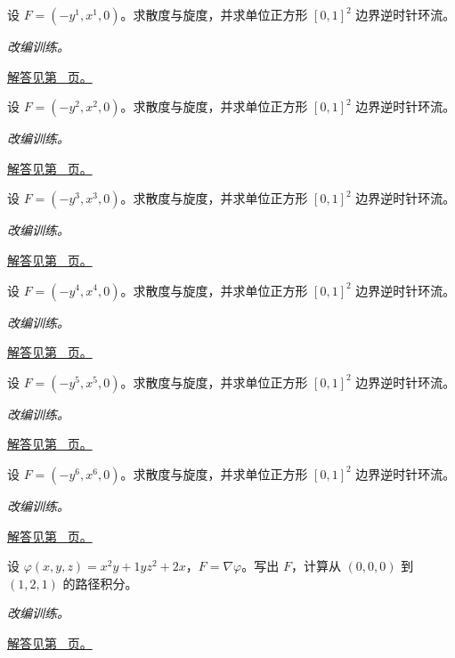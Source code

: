 \documentclass[UTF8,12pt,a4paper,fontset=fandol]{ctexart}
\begin{document}
\begin{example}[一个非零旋度的场]\label{ex:c44q7}
设 $F=(-y^{1},x^{1},0)$。求散度与旋度，并求单位正方形 $[0,1]^2$ 边界逆时针环流。
\par\textit{改编训练。}\par\hyperref[ans:c44q7]{解答见第~\pageref{ans:c44q7} 页。}
\end{example}
\begin{example}[一个非零旋度的场]\label{ex:c44q8}
设 $F=(-y^{2},x^{2},0)$。求散度与旋度，并求单位正方形 $[0,1]^2$ 边界逆时针环流。
\par\textit{改编训练。}\par\hyperref[ans:c44q8]{解答见第~\pageref{ans:c44q8} 页。}
\end{example}
\begin{example}[一个非零旋度的场]\label{ex:c44q9}
设 $F=(-y^{3},x^{3},0)$。求散度与旋度，并求单位正方形 $[0,1]^2$ 边界逆时针环流。
\par\textit{改编训练。}\par\hyperref[ans:c44q9]{解答见第~\pageref{ans:c44q9} 页。}
\end{example}
\begin{example}[一个非零旋度的场]\label{ex:c44q10}
设 $F=(-y^{4},x^{4},0)$。求散度与旋度，并求单位正方形 $[0,1]^2$ 边界逆时针环流。
\par\textit{改编训练。}\par\hyperref[ans:c44q10]{解答见第~\pageref{ans:c44q10} 页。}
\end{example}
\begin{example}[一个非零旋度的场]\label{ex:c44q11}
设 $F=(-y^{5},x^{5},0)$。求散度与旋度，并求单位正方形 $[0,1]^2$ 边界逆时针环流。
\par\textit{改编训练。}\par\hyperref[ans:c44q11]{解答见第~\pageref{ans:c44q11} 页。}
\end{example}
\begin{example}[一个非零旋度的场]\label{ex:c44q12}
设 $F=(-y^{6},x^{6},0)$。求散度与旋度，并求单位正方形 $[0,1]^2$ 边界逆时针环流。
\par\textit{改编训练。}\par\hyperref[ans:c44q12]{解答见第~\pageref{ans:c44q12} 页。}
\end{example}
\begin{example}[势函数给出的空间路径积分]\label{ex:c44q13}
设 $\varphi(x,y,z)=x^2y+1yz^2+2x$，$F=\nabla\varphi$。写出 $F$，计算从 $(0,0,0)$ 到 $(1,2,1)$ 的路径积分。
\par\textit{改编训练。}\par\hyperref[ans:c44q13]{解答见第~\pageref{ans:c44q13} 页。}
\end{example}
\end{document}
